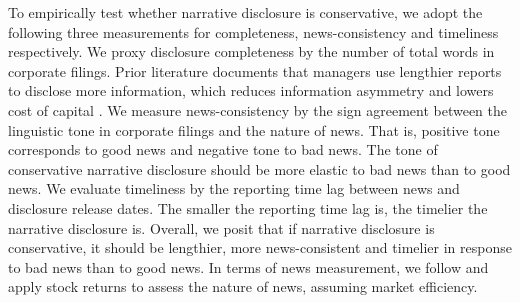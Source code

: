 \documentclass[a4paper]{article}
\begin{document}
\begin{spacing}{2}
To empirically test whether narrative disclosure is conservative, we adopt the following three measurements for completeness, news-consistency and timeliness respectively. We proxy disclosure completeness by the number of total words in corporate filings. Prior literature documents that managers use lengthier reports to disclose more information, which reduces information asymmetry and lowers cost of capital \citep*{leuzDisclosureCostCapital2009}. We measure news-consistency by the sign agreement between the linguistic tone in corporate filings and the nature of news. That is, positive tone corresponds to good news and negative tone to bad news. The tone of conservative narrative disclosure should be more elastic to bad news than to good news. We evaluate timeliness by the reporting time lag between news and disclosure release dates. The smaller the reporting time lag is, the timelier the narrative disclosure is. Overall, we posit that if narrative disclosure is conservative, it should be lengthier, more news-consistent and timelier in response to bad news than to good news. In terms of news measurement, we follow \citet{basuConservatismPrincipleAsymmetric1997} and apply stock returns to assess the nature of news, assuming market efficiency.


\end{spacing}
\end{document}
